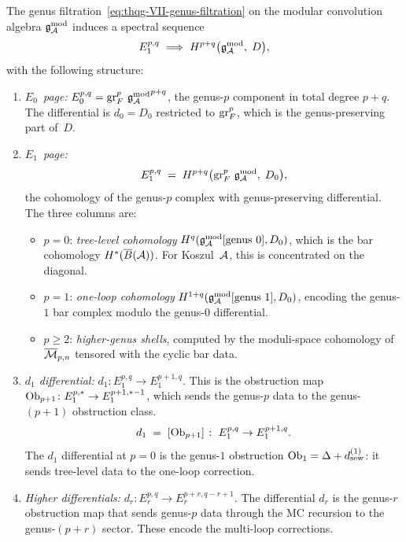 \begin{theorem}
\label{thm:thqg-VII-genus-ss}
The genus filtration~\eqref{eq:thqg-VII-genus-filtration}
on the modular convolution algebra $\mathfrak{g}_{\mathcal{A}}^{\mathrm{mod}}$ induces a
spectral sequence
\begin{equation}\label{eq:thqg-VII-genus-ss}
E_1^{p,q}
\;\Longrightarrow\;
H^{p+q}\bigl(\mathfrak{g}_{\mathcal{A}}^{\mathrm{mod}},\; D\bigr),
\end{equation}
with the following structure:

\begin{enumerate}[label=\textup{(\roman*)}]
\item \emph{$E_0$~page:}
 $E_0^{p,q} = \operatorname{gr}^p_F\,{\mathfrak{g}_{\mathcal{A}}^{\mathrm{mod}}}^{p+q}$,
 the genus-$p$ component in total degree $p + q$.
 The differential is $d_0 = D_0$ restricted to
 $\operatorname{gr}^p_F$, which is the genus-preserving part of~$D$.

\item \emph{$E_1$~page:}
 \begin{equation}\label{eq:thqg-VII-E1}
 E_1^{p,q}
 \;=\;
 H^{p+q}\bigl(\operatorname{gr}^p_F\,\mathfrak{g}_{\mathcal{A}}^{\mathrm{mod}},\; D_0\bigr),
 \end{equation}
 the cohomology of the genus-$p$ complex with
 genus-preserving differential. The three columns are:
 \begin{itemize}
 \item $p = 0$: \emph{tree-level cohomology}
 $H^q(\mathfrak{g}_{\mathcal{A}}^{\mathrm{mod}}[\text{genus }0], D_0)$, which is the
 bar cohomology $H^*(\overline{B}(\mathcal{A}))$. For Koszul~$\mathcal{A}$,
 this is concentrated on the diagonal.
 \item $p = 1$: \emph{one-loop cohomology}
 $H^{1+q}(\mathfrak{g}_{\mathcal{A}}^{\mathrm{mod}}[\text{genus }1], D_0)$, encoding
 the genus-$1$ bar complex modulo the genus-$0$
 differential.
 \item $p \geq 2$: \emph{higher-genus shells},
 computed by the moduli-space cohomology of
 $\overline{\mathcal{M}}_{p,n}$ tensored with the cyclic
 bar data.
 \end{itemize}

\item \emph{$d_1$ differential:}
 $d_1 \colon E_1^{p,q} \to E_1^{p+1,q}$.
 This is the obstruction map
 $\mathrm{Ob}_{p+1} \colon E_1^{p,*} \to E_1^{p+1,*-1}$,
 which sends the genus-$p$ data to the genus-$(p{+}1)$
 obstruction class.
 \begin{equation}\label{eq:thqg-VII-d1}
 d_1
 \;=\;
 [\mathrm{Ob}_{p+1}]
 \;\colon\;
 E_1^{p,q} \to E_1^{p+1,q}.
 \end{equation}
 The $d_1$ differential at $p = 0$ is the genus-$1$
 obstruction $\mathrm{Ob}_1 = \Delta + d_{\mathrm{sew}}^{(1)}$:
 it sends tree-level data to the one-loop correction.

\item \emph{Higher differentials:}
 $d_r \colon E_r^{p,q} \to E_r^{p+r,q-r+1}$.
 The differential $d_r$ is the genus-$r$ obstruction map
 that sends genus-$p$ data through the MC recursion to the
 genus-$(p{+}r)$ sector. These encode the multi-loop
 corrections.
\end{enumerate}
\end{theorem}

